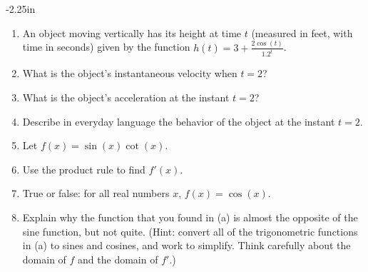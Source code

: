\begin{adjustwidth*}{}{-2.25in}
\begin{multicols*}{2}
\begin{enumerate}[1),start=40]
\item An object moving vertically has its height at time $t$ (measured in feet, with time in seconds) given by the function $h(t) = 3 + \frac{2\cos(t)}{1.2^t}$.
\ba
	\item What is the object's instantaneous velocity when $t =2$?
	\item What is the object's acceleration at the instant $t = 2$?
	\item Describe in everyday language the behavior of the object at the instant $t = 2$.
\ea

\item Let $f(x) = \sin(x) \cot(x)$.
\ba
	\item Use the product rule to find $f'(x)$.
	\item True or false: for all real numbers $x$, $f(x) = \cos(x)$.
	\item Explain why the function that you found in (a) is almost the opposite of the sine function, but not quite.  (Hint: convert all of the trigonometric functions in (a) to sines and cosines, and work to simplify.  Think carefully about the domain of $f$ and the domain of $f'$.)
\ea
\end{enumerate}

\end{multicols*}
\end{adjustwidth*}

\afterexercises